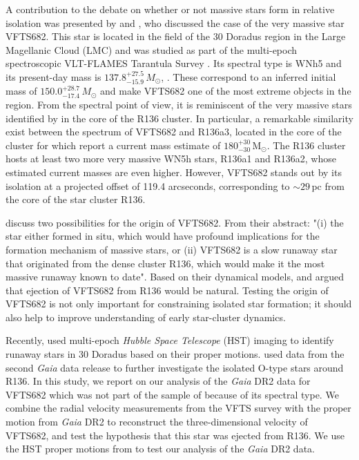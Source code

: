 \documentclass[a4paper,fleqn,usenatbib]{mnras}
\newcommand{\Msun}{{\,\mathrm{M}_\odot}}
\begin{document}
A contribution to the debate on whether or not massive
stars form in relative isolation was presented by
\cite{bestenlehner:11} and \cite{bressert:12}, who discussed the case of the very massive star
VFTS682.  This star is located in the field of the 30 Doradus region
in the Large Magellanic Cloud (LMC) and was studied as part of the
multi-epoch spectroscopic VLT-FLAMES Tarantula Survey \citep[VFTS,][]{evans:11}. Its spectral type is WNh5 and its present-day mass is $137.8^{+27.5}_{-15.9}\,M_\odot$,
\citep{schneider:18}. These correspond to an inferred initial mass of
$150.0^{+28.7}_{-17.4}\,M_\odot$ and make VFTS682 one of the
most extreme objects in the region.
%
From the spectral point of view, it is reminiscent of the very
massive stars %
identified by
\citet{dekoter:97,crowther:10, crowther:16} in the core of the
R136 cluster. In particular, a remarkable similarity exist between the
spectrum of VFTS682 and R136a3, located in the core of the cluster
\citep{crowther:10} for which \citet{crowther:16} report a
current mass estimate of $180^{+30}_{-30}\Msun$. The R136 cluster hosts
at least two more very massive WN5h stars, R136a1 and R136a2, whose
estimated current masses are even higher. However, VFTS682 stands
out by its isolation at a projected offset of 119.4 arcseconds, corresponding to $\sim$$29$\,pc from the core of the star cluster
R136.

\citet{bestenlehner:11} discuss two possibilities for the
origin of VFTS682. %
From their abstract: "(i) the
star either formed in situ, which would have profound implications for
the formation mechanism of massive stars, or (ii) VFTS682 is a slow
runaway star that originated from the dense cluster R136, which would
make it the most massive runaway known to date". Based on their
dynamical models, \citet{fujii:11} and \citet{banerjee:12} argued that
ejection of VFTS682 from R136 would be natural. Testing the origin of
VFTS682 is not only important for constraining isolated star
formation; it should also help to improve understanding of early star-cluster dynamics.

Recently, \citet{platais:15,platais:18} used multi-epoch \emph{Hubble Space
  Telescope} (HST) imaging to identify %
runaway stars in
 30 Doradus based on their proper motions. \citet{lennon:18} used data from the second \emph{Gaia}
data release \cite[DR2,][]{gaia:16,brown:18} to further investigate
the isolated O-type stars around R136. In this study, we
report on our analysis of the \emph{Gaia} DR2 data for VFTS682 which
was not part of the sample of \citet{lennon:18} because of its 
spectral type. We combine the radial velocity measurements from the
VFTS survey \citep[][]{evans:11} with the proper motion from
\emph{Gaia} DR2 to reconstruct the three-dimensional velocity of VFTS682, and test the hypothesis that this star was ejected from R136. We
use the HST proper motions from \citet{platais:18} to test our
analysis of the \emph{Gaia} DR2 data.
\end{document}
